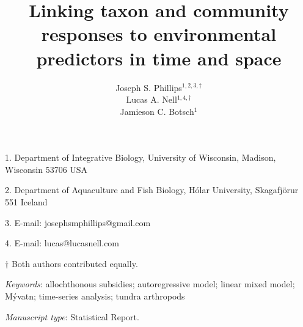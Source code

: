 \documentclass[12pt]{article}
\title{Linking taxon and community responses to environmental
predictors in time and space}
\author{
Joseph S. Phillips$^{1,2,3,\dagger}$ \\
Lucas A. Nell$^{1,4,\dagger}$ \\
Jamieson C. Botsch$^{1}$}
\date{}
\begin{document}
\maketitle


\noindent{} 1. Department of Integrative Biology, University of Wisconsin, Madison, Wisconsin 53706 USA

\noindent{} 2. Department of Aquaculture and Fish Biology, H\'{o}lar University, Skagafj\"{o}r{\dh}ur 551 Iceland

\noindent{} 3. E-mail: josephsmphillips@gmail.com

\noindent{} 4. E-mail: lucas@lucasnell.com

\noindent{} $\dagger$ Both authors contributed equally.



\bigskip


\bigskip


\textit{Keywords}: {allochthonous subsidies; autoregressive model; linear mixed model;
M\'{y}vatn; time-series analysis; tundra arthropods
}


\bigskip

\textit{Manuscript type}: Statistical Report.


\linenumbers{}

\newpage{}





\newpage{}



\end{document}
